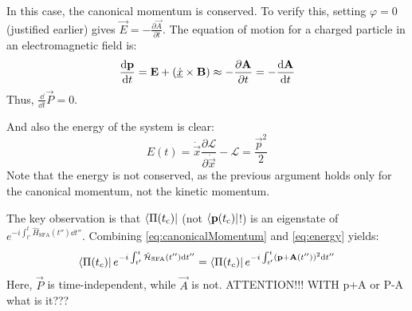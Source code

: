 In this case, the canonical momentum is conserved. 
To verify this, setting $\varphi=0$ (justified earlier) gives $\vec{E} = -\frac{\partial \vec{A}}{\partial t}$. 
The equation of motion for a charged particle in an electromagnetic field \cite{LandauLifschitzBand2} is:
\begin{equation*}
    \frac{\dd\vec{p}}{\dd t} = \vec{E} + \left(\uvec{\dot{x}}\times\vec{B}\right) \approx -\frac{\partial \vec{A}}{\partial t} = -\frac{\dd \vec{A}}{\dd t}   %
\end{equation*}
Thus, $\frac{\dd}{\dd t}\vec{P}=0$.

And also the energy of the system is clear:
\begin{equation}
    E(t) = \dot{\vec{x}}\frac{\partial \mathcal{L}}{\partial \dot{\vec{x}}}-\mathcal{L} = \frac{\vec{p}^2}{2} \label{eq:energy}
\end{equation}
Note that the energy is not conserved, as the previous argument holds only for the canonical momentum, not the kinetic momentum.

The key observation is that $\bra{\Pi(t_{\mathrm{c}})}$ (not $\bra{\mathbf{p}(t_{\mathrm{c}})}$!) is an eigenstate of $e^{-i \int_{t'}^{t} \hat{H}_{\mathrm{SFA}}(t'') \dd t''}$. 
Combining \eqref{eq:canonicalMomentum} and \eqref{eq:energy} yields:
\begin{equation*}
    \bra{\Pi(t_c)}e^{-i \int_{t'}^{t} \hat{\mathcal{H}}_{\mathrm{SFA}}(t'') \mathrm{d} t''} = \bra{\Pi(t_c)}e^{-i \int_{t'}^{t} (\mathbf{p} + \mathbf{A}(t''))^2 \mathrm{d} t''}
\end{equation*}
Here, $\vec{P}$ is time-independent, while $\vec{A}$ is not.
ATTENTION!!! WITH p+A or P-A what is it???

